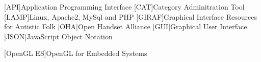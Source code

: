 [API]{Application Programming Interface}
[CAT]{Category Adminitration Tool}
[LAMP]{Linux, Apache2, MySql and PHP}
[GIRAF]{Graphical Interface Resources for Autistic Folk}
[OHA]{Open Handset Alliance}
[GUI]{Graphical User Interface}
[JSON]{JavaScript Object Notation}

[OpenGL ES]{OpenGL for Embedded Systems}
